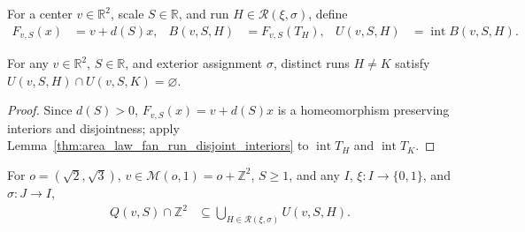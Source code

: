 \begin{definition}
    \label{def:area_law_repair_birth}
    \leanok
    For a center $v\in\mathbb R^2$, scale $S\in\mathbb R$, and run $H\in\mathcal R(\xi,\sigma)$, define
    \begin{align}
        F_{v,S}(x) & =v+d(S)x,
                   & B(v,S,H)  & =F_{v,S}(T_H),
                   & U(v,S,H)  & =\operatorname{int}B(v,S,H).
        \label{eq:area_law_repair_birth}
    \end{align}
\end{definition}

\begin{lemma}
    \label{thm:area_law_repair_replacement_disjoint}
    \leanok
    For any $v\in\mathbb R^2$, $S\in\mathbb R$, and exterior assignment $\sigma$, distinct runs
    $H\ne K$ satisfy $U(v,S,H)\cap U(v,S,K)=\varnothing$.
\end{lemma}
\begin{proof}\leanok
    Since $d(S)>0$, $F_{v,S}(x)=v+d(S)x$ is a homeomorphism preserving interiors and disjointness;
    apply Lemma~\ref{thm:area_law_fan_run_disjoint_interiors} to $\operatorname{int}T_H$ and $\operatorname{int}T_K$.
\end{proof}

\begin{lemma}
    \label{thm:area_law_repair_replacement_lattice_cover}
    \leanok
    For $o=(\sqrt2,\sqrt3)$, $v\in\mathcal M(o,1)=o+\mathbb Z^2$, $S\ge1$, and any $I$,
    $\xi:I\to\{0,1\}$, and $\sigma:J\to I$,
    \begin{align}
        Q(v,S)\cap\mathbb Z^2
         & \subseteq\bigcup_{H\in\mathcal R(\xi,\sigma)}U(v,S,H).
        \label{eq:area_law_repair_replacement_lattice_cover}
    \end{align}
\end{lemma}

